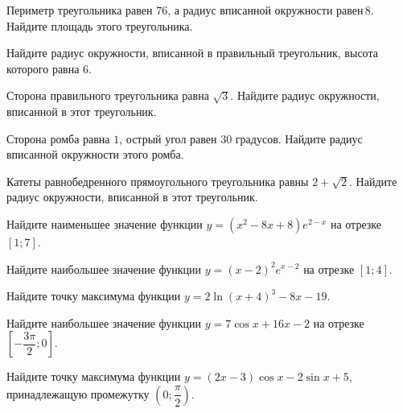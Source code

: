 \begin{class}[number=8]
	\begin{listofex}
		\item Периметр треугольника равен \(76\), а радиус вписанной окружности равен \(8\). Найдите площадь этого треугольника.
		\item Найдите радиус окружности, вписанной в правильный треугольник, высота которого равна \(6\).
		\item Сторона правильного треугольника равна \(\sqrt{3}\). Найдите радиус окружности, вписанной в этот треугольник.
		\item Сторона ромба равна \(1\), острый угол равен \(30\) градусов. Найдите радиус вписанной окружности этого ромба.
		\item Катеты равнобедренного прямоугольного треугольника равны \(2+\sqrt{2}\). Найдите радиус окружности, вписанной в этот треугольник.
		\item Найдите наименьшее значение функции \( y=(x^2-8x+8)e^{2-x} \) на отрезке \( [1;7] \).
		\item Найдите наибольшее значение функции \( y=(x-2)^2e^{x-2} \) на отрезке \( [1;4] \).
		\item Найдите точку максимума функции \( y=2\ln(x+4)^3-8x-19 \).
		\item Найдите наибольшее значение функции \( y=7\cos x+16x-2 \) на отрезке \( \left[ -\dfrac{ 3\pi }{ 2 };0 \right] \).
		\item Найдите точку максимума функции \( y=(2x-3)\cos x - 2 \sin x+5 \), принадлежащую промежутку \( \left( 0; \dfrac{ \pi }{ 2 } \right) \).

\end{listofex}
\end{class}
